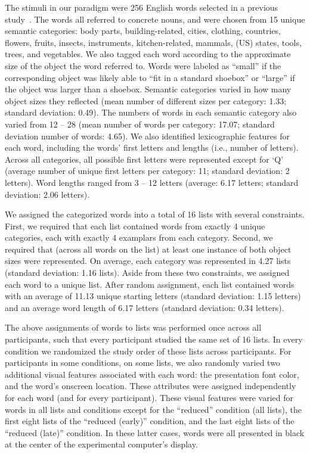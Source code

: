 \documentclass[11pt]{article}
\begin{document}
The stimuli in our paradigm were 256 English words selected in a previous
study~\citep{ZimaEtal18}. The words all referred to concrete nouns, and were
chosen from 15 unique semantic categories: body parts, building-related,
cities, clothing, countries, flowers, fruits, insects, instruments,
kitchen-related, mammals, (US) states, tools, trees, and vegetables. We also
tagged each word according to the approximate size of the object the word
referred to. Words were labeled as ``small'' if the corresponding object was
likely able to ``fit in a standard shoebox'' or ``large'' if the object was
larger than a shoebox. Semantic categories varied in how many object sizes they
reflected (mean number of different sizes per category: 1.33; standard
deviation: 0.49). The numbers of words in each semantic category also varied
from 12 -- 28 (mean number of words per category: 17.07; standard deviation
number of words: 4.65). We also identified lexicographic features for each
word, including the words' first letters and lengths (i.e., number of letters).
Across all categories, all possible first letters were represented except for
`Q' (average number of unique first letters per category: 11; standard
deviation: 2 letters). Word lengths ranged from 3 -- 12 letters (average: 6.17
letters; standard deviation: 2.06 letters).

We assigned the categorized words into a total of 16 lists with several
constraints. First, we required that each list contained words from exactly 4
unique categories, each with exactly 4 examplars from each category. Second, we
required that (across all words on the list) at least one instance of both
object sizes were represented. On average, each category was represented in
4.27 lists (standard deviation: 1.16 lists). Aside from these two constraints,
we assigned each word to a unique list. After random assignment, each list
contained words with an average of 11.13 unique starting letters (standard
deviation: 1.15 letters) and an average word length of 6.17 letters (standard
deviation: 0.34 letters).

The above assignments of words to lists was performed once across all
participants, such that every participant studied the same set of 16 lists. In
every condition we randomized the study order of these lists across
participants. For participants in some conditions, on some lists, we also
randomly varied two additional visual features associated with each word: the
presentation font color, and the word's onscreen location. These attributes
were assigned independently for each word (and for every participant). These
visual features were varied for words in all lists and conditions except for
the ``reduced'' condition (all lists), the first eight lists of the ``reduced
(early)'' condition, and the last eight lists of the ``reduced (late)''
condition. In these latter cases, words were all presented in black at the
center of the experimental computer's display.
\end{document}
